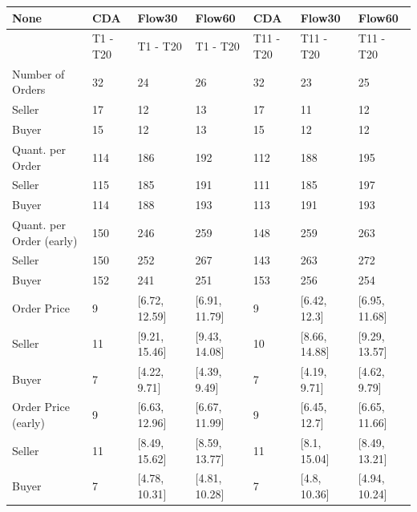 \begin{tabular}{lllllll}
\hline
 None                     & CDA      & Flow30         & Flow60         & CDA       & Flow30         & Flow60         \\
\hline
                          & T1 - T20 & T1 - T20      & T1 - T20      & T11 - T20 & T11 - T20     & T11 - T20     \\
 Number of Orders         & 32       & 24            & 26            & 32        & 23            & 25            \\
 Seller                   & 17       & 12            & 13            & 17        & 11            & 12            \\
 Buyer                    & 15       & 12            & 13            & 15        & 12            & 12            \\
 Quant. per Order         & 114      & 186           & 192           & 112       & 188           & 195           \\
 Seller                   & 115      & 185           & 191           & 111       & 185           & 197           \\
 Buyer                    & 114      & 188           & 193           & 113       & 191           & 193           \\
 Quant. per Order (early) & 150      & 246           & 259           & 148       & 259           & 263           \\
 Seller                   & 150      & 252           & 267           & 143       & 263           & 272           \\
 Buyer                    & 152      & 241           & 251           & 153       & 256           & 254           \\
 Order Price              & 9        & [6.72, 12.59] & [6.91, 11.79] & 9         & [6.42, 12.3]  & [6.95, 11.68] \\
 Seller                   & 11       & [9.21, 15.46] & [9.43, 14.08] & 10        & [8.66, 14.88] & [9.29, 13.57] \\
 Buyer                    & 7        & [4.22, 9.71]  & [4.39, 9.49]  & 7         & [4.19, 9.71]  & [4.62, 9.79]  \\
 Order Price (early)      & 9        & [6.63, 12.96] & [6.67, 11.99] & 9         & [6.45, 12.7]  & [6.65, 11.66] \\
 Seller                   & 11       & [8.49, 15.62] & [8.59, 13.77] & 11        & [8.1, 15.04]  & [8.49, 13.21] \\
 Buyer                    & 7        & [4.78, 10.31] & [4.81, 10.28] & 7         & [4.8, 10.36]  & [4.94, 10.24] \\

\end{tabular}

